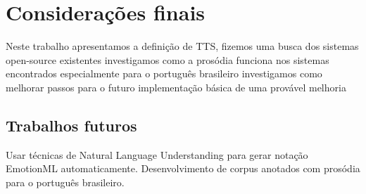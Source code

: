 
\chapter{Considerações finais}
Neste trabalho apresentamos a definição de TTS,
fizemos uma busca dos sistemas open-source existentes
investigamos como a prosódia funciona nos sistemas encontrados
especialmente para o português brasileiro
investigamos como melhorar
passos para o futuro
implementação básica de uma provável melhoria

\section{Trabalhos futuros}
Usar técnicas de Natural Language Understanding para gerar notação EmotionML
automaticamente.
Desenvolvimento de corpus anotados com prosódia para o
português brasileiro.

